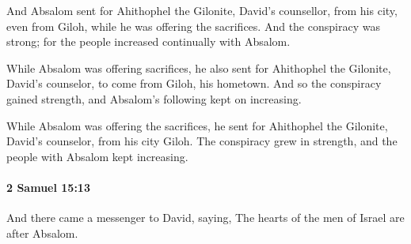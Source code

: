			\begin{versebox}
					\item[BHS] 
					\item[ASV] And Absalom sent for Ahithophel the Gilonite, David's counsellor, from his city, even from Giloh, while he was offering the sacrifices. And the conspiracy was strong; for the people increased continually with Absalom.
					\item[NIV] While Absalom was offering sacrifices, he also sent for Ahithophel the Gilonite, David’s counselor, to come from Giloh, his hometown. And so the conspiracy gained strength, and Absalom’s following kept on increasing.
					\item[NRSV] While Absalom was offering the sacrifices, he sent for Ahithophel the Gilonite, David’s counselor, from his city Giloh. The conspiracy grew in strength, and the people with Absalom kept increasing.
			\end{versebox}

		\paragraph{2 Samuel 15:13} %
			\label{2SAMUEL-15-13}

			And there came a messenger to David, saying, The hearts of the men of Israel are after Absalom.

